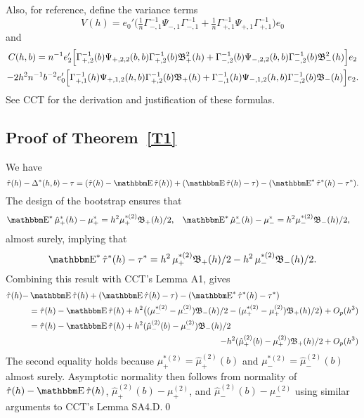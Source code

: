\documentclass[12pt,fleqn]{article}
\begin{document}
Also, for reference, define the variance terms
\begin{equation*}
  V(h)
  = e_0' \Big(\tfrac{1}{n} \Gamma_{-,1}^{-1} \Psi_{-,1} \Gamma_{-,1}^{-1}
  + \tfrac{1}{n} \Gamma_{+,1}^{-1} \Psi_{+,1} \Gamma_{+,1}^{-1}\Big) e_0
\end{equation*}
and
\begin{multline*}
  C(h,b) =
  n^{-1} e_2' \Big[
    \Gamma_{+,2}^{-1}(b) \Psi_{+,2,2}(b,b) \Gamma_{+,2}^{-1}(b) \mathfrak{B}^2_+(h) +
    \Gamma_{-,2}^{-1}(b) \Psi_{-,2,2}(b,b) \Gamma_{-,2}^{-1}(b) \mathfrak{B}^2_-(h)
    \Big] e_2 \\
  - 2 h^2 n^{-1} b^{-2}
    e_0' \Big[
    \Gamma^{-1}_{+,1}(h) \Psi_{+,1,2}(h,b) \Gamma_{+,2}^{-1}(b) \mathfrak{B}_+(h) +
    \Gamma^{-1}_{-,1}(h) \Psi_{-,1,2}(h,b) \Gamma_{-,2}^{-1}(b) \mathfrak{B}_-(h)
    \Big] e_2.
\end{multline*}
See CCT for the derivation and justification of these formulas.

\subsection{Proof of Theorem~\ref{T1}}
We have
\begin{equation*}
  \hat\tau(h) - \Delta^*(h,b) - \tau = (\hat\tau(h) - \E \hat \tau(h)) +
  (\E \hat \tau(h) - \tau) - (\E^* \hat \tau^*(h) - \tau^*).
\end{equation*}
The design of the bootstrap ensures that
\begin{align*}
  \E^* \hat\mu_{+}^*(h) - \mu_{+}^{*}
  &= h^{2} \mu_+^{*(2)} \Bf_{+}(h)/2,
  &\E^* \hat\mu_{-}^*(h) - \mu_{-}^{*}
  &= h^{2} \mu_-^{*(2)} \Bf_{-}(h)/2,
\end{align*}
almost surely, implying that
\begin{equation}
  \label{eq:7}
  \E^* \hat\tau^*(h) - \tau^{*} = h^2\, \mu_+^{*(2)} \Bf_+(h)/2
  - h^2\, \mu_{-}^{*(2)} \Bf_{-}(h)/2.
\end{equation}
Combining this result with CCT's Lemma A1, gives
\begin{align}
  \hat\tau(h) - & \E \hat\tau(h) + (\E \hat\tau(h) - \tau) - (\E^* \hat\tau^*(h) - \tau^*)\notag \\
  &= \hat\tau(h) - \E\hat\tau(h)
   + h^2 \big((\mu_{-}^{*(2)} - \mu_{-}^{(2)}) \Bf_{-}(h) /2
   - (\mu_+^{*(2)}-\mu_+^{(2)}) \Bf_{+}(h) / 2 \big) + O_p(h^{3}) \notag \\
  \label{eq:8}
  &= \hat\tau(h) - \E\hat\tau(h)
   + h^2 (\hat\mu_-^{(2)}(b) - \mu_-^{(2)}) \Bf_{-}(h) /2 \\
  \notag
  &\pushright{- h^2 (\hat\mu_+^{(2)}(b) - \mu_+^{(2)}) \Bf_{+}(h) / 2 + O_p(h^{3})}
\end{align}
The second equality holds because
$\mu_+^{*(2)} = \hat\mu_{+}^{(2)}(b)$ and
$\mu_-^{*(2)} = \hat\mu_{-}^{(2)}(b)$ almost surely. Asymptotic
normality then follows from normality of $\hat\tau(h) - \E\hat\tau(h)$,
$\hat\mu_+^{(2)}(b) - \mu_+^{(2)}$, and
$\hat\mu_-^{(2)}(b) - \mu_-^{(2)}$ using similar arguments to
CCT's Lemma SA4.D.\qed
\end{document}
